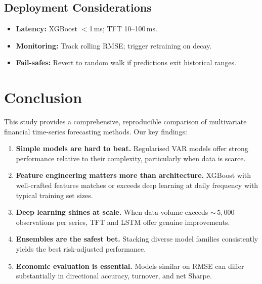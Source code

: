 \documentclass[11pt,a4paper,twocolumn]{article}
\begin{document}
\subsection{Deployment Considerations}

\begin{itemize}[leftmargin=*,itemsep=1pt]
    \item \textbf{Latency:} XGBoost $<$1\,ms; TFT 10--100\,ms.
    \item \textbf{Monitoring:} Track rolling RMSE; trigger retraining on decay.
    \item \textbf{Fail-safes:} Revert to random walk if predictions exit
          historical ranges.
\end{itemize}


\section{Conclusion}\label{sec:conclusion}

This study provides a comprehensive, reproducible comparison of multivariate
financial time-series forecasting methods.  Our key findings:

\begin{enumerate}[leftmargin=*,itemsep=2pt]
    \item \textbf{Simple models are hard to beat.}  Regularised VAR models
          offer strong performance relative to their complexity, particularly
          when data is scarce.
    \item \textbf{Feature engineering matters more than architecture.}  XGBoost
          with well-crafted features matches or exceeds deep learning at daily
          frequency with typical training set sizes.
    \item \textbf{Deep learning shines at scale.}  When data volume exceeds
          ${\sim}\,5{,}000$ observations per series, TFT and LSTM offer genuine
          improvements.
    \item \textbf{Ensembles are the safest bet.}  Stacking diverse model
          families consistently yields the best risk-adjusted performance.
    \item \textbf{Economic evaluation is essential.}  Models similar on RMSE can
          differ substantially in directional accuracy, turnover, and net Sharpe.
\end{enumerate}
\end{document}
